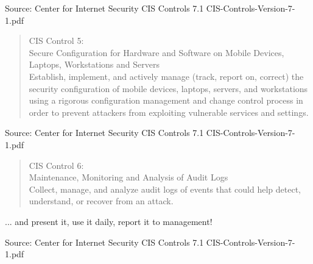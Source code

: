 \documentclass[Screen16to9,17pt]{foils}
\begin{document}
\begin{list1}
\item
\item
\item
\item
\end{list1}

Source: Center for Internet Security CIS Controls 7.1 CIS-Controls-Version-7-1.pdf


\begin{quote}
CIS Control 5:\\
Secure Configuration for Hardware and Software on Mobile Devices, Laptops, Workstations and Servers\\
Establish, implement, and actively manage (track, report on, correct) the security configuration of mobile devices, laptops, servers, and workstations using a rigorous configuration management and change control process in order to prevent attackers from exploiting vulnerable services and settings.
\end{quote}

\begin{list1}
\item
\item
\item
\item
\end{list1}

Source: Center for Internet Security CIS Controls 7.1 CIS-Controls-Version-7-1.pdf


\begin{quote}
CIS Control 6:\\
Maintenance, Monitoring and Analysis of Audit Logs\\
Collect, manage, and analyze audit logs of events that could help detect, understand, or recover from an attack.
\end{quote}

\begin{list1}
\item ... and present it, use it daily, report it to management!
\item
\item
\item
\end{list1}

Source: Center for Internet Security CIS Controls 7.1 CIS-Controls-Version-7-1.pdf
\end{document}
